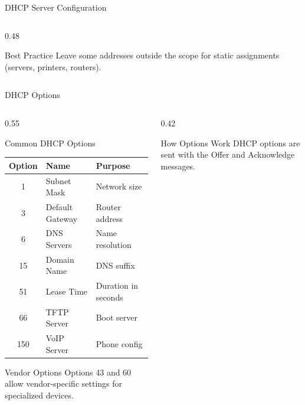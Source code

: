 \documentclass[aspectratio=169, 11pt]{beamer}
\begin{document}
\begin{frame}{DHCP Server Configuration}
\begin{columns}[T]
\begin{column}{0.48\textwidth}
            \vspace{0.2em}
            \begin{alertblock}{Best Practice}
                \small
                Leave some addresses outside the scope for static assignments (servers, printers, routers).
            \end{alertblock}
        \end{column}
    \end{columns}
\end{frame}

\begin{frame}{DHCP Options}
    \begin{columns}[T]
        \begin{column}{0.55\textwidth}
            \begin{block}{Common DHCP Options}
                \small
                \begin{tabular}{c l l}
                    \toprule
                    \textbf{Option} & \textbf{Name} & \textbf{Purpose} \\
                    \midrule
                    1 & Subnet Mask & Network size \\
                    3 & Default Gateway & Router address \\
                    6 & DNS Servers & Name resolution \\
                    15 & Domain Name & DNS suffix \\
                    51 & Lease Time & Duration in seconds \\
                    66 & TFTP Server & Boot server \\
                    150 & VoIP Server & Phone config \\
                    \bottomrule
                \end{tabular}
            \end{block}
            
            \vspace{0.2em}
            \begin{exampleblock}{Vendor Options}
                \small
                Options 43 and 60 allow vendor-specific settings for specialized devices.
            \end{exampleblock}
        \end{column}
        \begin{column}{0.42\textwidth}
            \begin{block}{How Options Work}
                \small
                DHCP options are sent with the Offer and Acknowledge messages.
                

\end{block}
\end{column}
\end{columns}
\end{frame}
\end{document}
